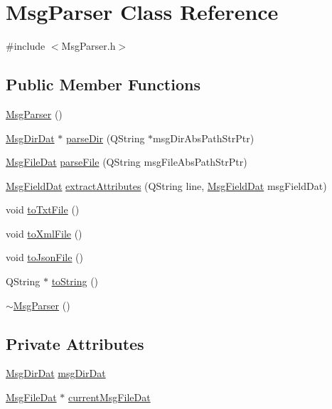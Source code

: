 \hypertarget{class_msg_parser}{\section{Msg\-Parser Class Reference}
\label{class_msg_parser}
}


{\ttfamily \#include $<$Msg\-Parser.\-h$>$}

\subsection*{Public Member Functions}
\begin{DoxyCompactItemize}
\item 
\hyperlink{class_msg_parser_ab1e677e497e0e3872062dbb26d5d0d44}{Msg\-Parser} ()
\item 
\hyperlink{class_msg_dir_dat}{Msg\-Dir\-Dat} $\ast$ \hyperlink{class_msg_parser_af5b769209a5d0fb656acd845c8a19258}{parse\-Dir} (Q\-String $\ast$msg\-Dir\-Abs\-Path\-Str\-Ptr)
\item 
\hyperlink{class_msg_file_dat}{Msg\-File\-Dat} \hyperlink{class_msg_parser_a3361c858ee2df19f1c2d11e62434ee26}{parse\-File} (Q\-String msg\-File\-Abs\-Path\-Str\-Ptr)
\item 
\hyperlink{class_msg_field_dat}{Msg\-Field\-Dat} \hyperlink{class_msg_parser_ae61a0ab6192ce566652b89df9253181c}{extract\-Attributes} (Q\-String line, \hyperlink{class_msg_field_dat}{Msg\-Field\-Dat} msg\-Field\-Dat)
\item 
void \hyperlink{class_msg_parser_a397a8db3ba7355593edeb6735823042a}{to\-Txt\-File} ()
\item 
void \hyperlink{class_msg_parser_a5c5d3f6fd83e1ae8a6e350f920f0041b}{to\-Xml\-File} ()
\item 
void \hyperlink{class_msg_parser_ae016f213f91480196957842a2c6e4a73}{to\-Json\-File} ()
\item 
Q\-String $\ast$ \hyperlink{class_msg_parser_aa129654a7d90d48ce2cda367c2e21ac8}{to\-String} ()
\item 
\hyperlink{class_msg_parser_a936b164bb49dbfb69e4963d168569876}{$\sim$\-Msg\-Parser} ()
\end{DoxyCompactItemize}
\subsection*{Private Attributes}
\begin{DoxyCompactItemize}
\item 
\hyperlink{class_msg_dir_dat}{Msg\-Dir\-Dat} \hyperlink{class_msg_parser_a5f738a06fca187d8e0c6ff2530fcd978}{msg\-Dir\-Dat}
\item 
\hyperlink{class_msg_file_dat}{Msg\-File\-Dat} $\ast$ \hyperlink{class_msg_parser_ac6b6991b7abc90ee14dedf95bafa2db3}{current\-Msg\-File\-Dat}
\end{DoxyCompactItemize}



